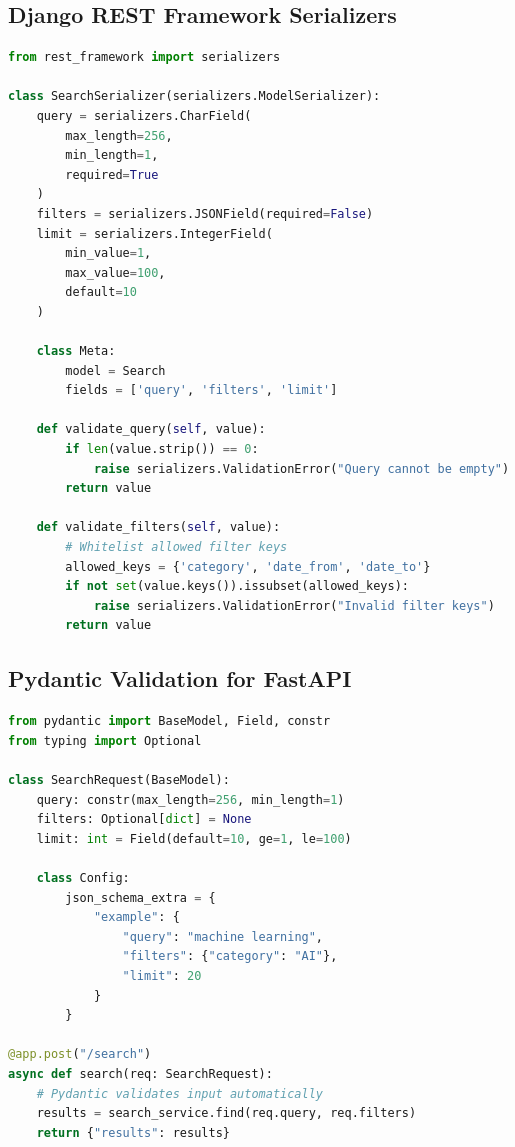 \documentclass{report}
\begin{document}
\subsection{Django REST Framework Serializers}
\begin{lstlisting}[language=Python]
from rest_framework import serializers

class SearchSerializer(serializers.ModelSerializer):
    query = serializers.CharField(
        max_length=256,
        min_length=1,
        required=True
    )
    filters = serializers.JSONField(required=False)
    limit = serializers.IntegerField(
        min_value=1,
        max_value=100,
        default=10
    )
    
    class Meta:
        model = Search
        fields = ['query', 'filters', 'limit']
    
    def validate_query(self, value):
        if len(value.strip()) == 0:
            raise serializers.ValidationError("Query cannot be empty")
        return value
    
    def validate_filters(self, value):
        # Whitelist allowed filter keys
        allowed_keys = {'category', 'date_from', 'date_to'}
        if not set(value.keys()).issubset(allowed_keys):
            raise serializers.ValidationError("Invalid filter keys")
        return value
\end{lstlisting}

\subsection{Pydantic Validation for FastAPI}
\begin{lstlisting}[language=Python]
from pydantic import BaseModel, Field, constr
from typing import Optional

class SearchRequest(BaseModel):
    query: constr(max_length=256, min_length=1)
    filters: Optional[dict] = None
    limit: int = Field(default=10, ge=1, le=100)
    
    class Config:
        json_schema_extra = {
            "example": {
                "query": "machine learning",
                "filters": {"category": "AI"},
                "limit": 20
            }
        }

@app.post("/search")
async def search(req: SearchRequest):
    # Pydantic validates input automatically
    results = search_service.find(req.query, req.filters)
    return {"results": results}
\end{lstlisting}
\end{document}
